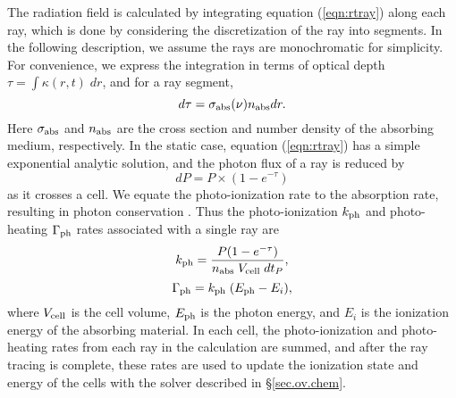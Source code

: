 The radiation field is calculated by integrating equation
(\ref{eqn:rtray}) along each ray, which is done by considering the
discretization of the ray into segments.  In the following
description, we assume the rays are monochromatic for simplicity.  For
convenience, we express the integration in terms of optical depth
$\tau = \int \kappa(r,t) \; dr$, and for a ray segment,
%
\begin{equation}
  \label{eqn:dtau}
  d\tau = \sigma_{\rm abs}(\nu) n_{\rm abs} dr.
\end{equation}
Here $\sigma_{\rm abs}$ and $n_{\rm abs}$ are the cross section and
number density of the absorbing medium, respectively.  In the static
case, equation (\ref{eqn:rtray}) has a simple exponential analytic
solution, and the photon flux of a ray is reduced by
%
\begin{equation}
  \label{eqn:flux}
  dP = P \times (1 - e^{-\tau})
\end{equation}
as it crosses a cell.  We equate the photo-ionization rate to the
absorption rate, resulting in photon conservation \citep{Abel99_RT,
  Mellema06}.  Thus the photo-ionization $k_{\rm ph}$ and
photo-heating $\Gamma_{\rm ph}$ rates associated with a single ray are
%
\begin{equation}
  \label{eqn:kph}
  k_{\rm ph} = \frac{P (1 - e^{-\tau})}{n_{\rm abs} \; V_{\rm cell} \; dt_P},
\end{equation}
\begin{equation}
  \label{eqn:gamma}
  \Gamma_{\rm ph} = k_{\rm ph} \; (E_{\rm ph} - E_i),
\end{equation}
where $V_{\rm cell}$ is the cell volume, $E_{\rm ph}$ is the photon
energy, and $E_i$ is the ionization energy of the absorbing material.
In each cell, the photo-ionization and photo-heating rates from each
ray in the calculation are summed, and after the ray tracing is
complete, these rates are used to update the ionization state and
energy of the cells with the solver described in \S\ref{sec.ov.chem}.


